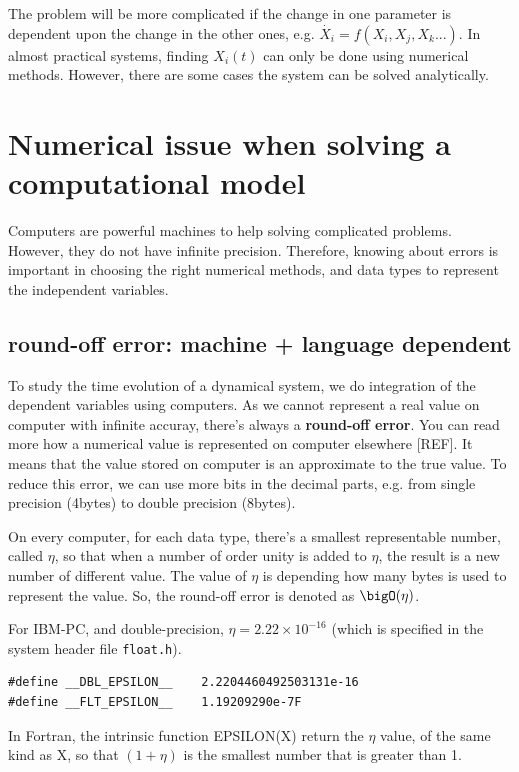 The problem will be more complicated if the change in one parameter is
dependent upon the change in the other ones, e.g. $\dot{X_i} = f(X_i,
X_j, X_k...)$.  In almost practical systems, finding $X_i(t)$ can only
be done using numerical methods. However, there are some cases the
system can be solved analytically.

\section{Numerical issue when solving a computational model}

Computers are powerful machines to help solving complicated problems.
However, they do not have infinite precision. Therefore, knowing about errors is
important in choosing the right numerical methods, and data types to represent
the independent variables.

\subsection{round-off error: machine + language dependent}
\label{sec:round-off-error}

To study the time evolution of a dynamical system, we do integration of the
dependent variables using computers. As we cannot represent a real value on
computer with infinite accuray, there's always a {\bf round-off error}. You can read
more how a numerical value is represented on computer elsewhere [REF].
It means that the value stored on computer is an approximate to the true value. To reduce this
error, we can use more bits in the decimal parts, e.g. from single precision
(4bytes) to double precision (8bytes). 

On every computer, for each data type, there's a smallest representable number,
called $\eta$, so that when a number of order unity is added to $\eta$, the
result is a new number of different value. The value of $\eta$ is depending how
many bytes is used to represent the value. So, the round-off error is denoted as
$\bigO(\eta)$.

For IBM-PC, and double-precision, $\eta=2.22\times 10^{-16}$ (which is specified
in the system header file \verb!float.h!).
\begin{verbatim}
#define __DBL_EPSILON__    2.2204460492503131e-16
#define __FLT_EPSILON__    1.19209290e-7F
\end{verbatim}
In Fortran, the intrinsic function EPSILON(X) return the $\eta$ value, of the
same kind as X, so that $(1+\eta)$ is the smallest number that is greater than
1.

